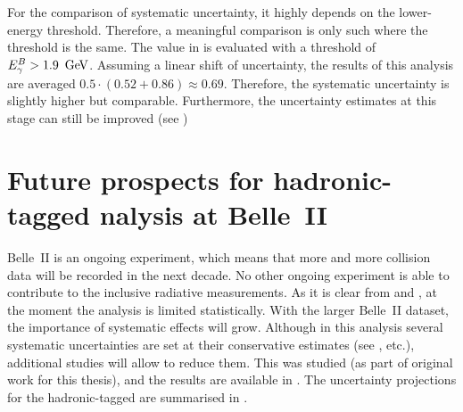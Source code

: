For the comparison of systematic uncertainty, it highly depends on the lower-\EB energy threshold.
Therefore, a meaningful comparison is only such where the \EB threshold is the same.
The value in  is evaluated with a threshold of ${E^B_{\gamma}}>1.9~\mathrm{\,Ge\kern -0.1em V}$.
Assuming a linear shift of uncertainty, the results of this analysis are averaged $0.5\cdot(0.52+0.86)\approx0.69$.
Therefore, the systematic uncertainty is slightly higher but comparable.
Furthermore, the uncertainty estimates at this stage can still be improved
(see )

\section{Future prospects for hadronic-tagged \texorpdfstring{\BtoXsgamma} analysis at Belle~II}\label{sec:future_prospects}

Belle~II is an ongoing experiment, which means that more and more \epem collision data will be recorded in the next decade.
No other ongoing experiment is able to contribute to the inclusive radiative measurements.
As it is clear from  and , at the moment the analysis is limited statistically.
With the larger Belle~II dataset, the importance of systematic effects will grow.
Although in this analysis several systematic uncertainties are set at their conservative estimates (see ,  etc.),
additional studies will allow to reduce them.
This was studied (as part of original work for this thesis), and the results are available in \cite{Belle-II:2022cgf}.
The uncertainty projections for the hadronic-tagged \BtoXsgamma are summarised in .

